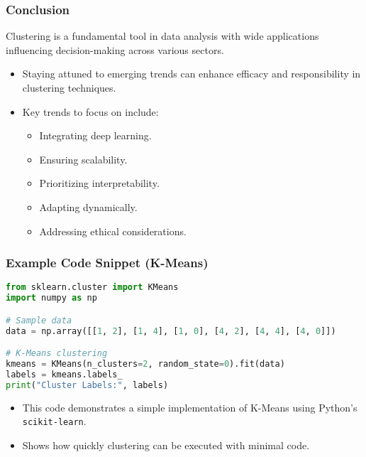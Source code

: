 \documentclass{beamer}
\begin{document}
\begin{frame}[fragile]
    \frametitle{Conclusion}
    Clustering is a fundamental tool in data analysis with wide applications influencing decision-making across various sectors. 

    \begin{itemize}
        \item Staying attuned to emerging trends can enhance efficacy and responsibility in clustering techniques.
        \item Key trends to focus on include:
        \begin{itemize}
            \item Integrating deep learning.
            \item Ensuring scalability.
            \item Prioritizing interpretability.
            \item Adapting dynamically.
            \item Addressing ethical considerations.
        \end{itemize}
    \end{itemize}
\end{frame}

\begin{frame}[fragile]
    \frametitle{Example Code Snippet (K-Means)}
    \begin{lstlisting}[language=Python]
from sklearn.cluster import KMeans
import numpy as np

# Sample data
data = np.array([[1, 2], [1, 4], [1, 0], [4, 2], [4, 4], [4, 0]])

# K-Means clustering
kmeans = KMeans(n_clusters=2, random_state=0).fit(data)
labels = kmeans.labels_
print("Cluster Labels:", labels)
    \end{lstlisting}
    \begin{itemize}
        \item This code demonstrates a simple implementation of K-Means using Python's \texttt{scikit-learn}.
        \item Shows how quickly clustering can be executed with minimal code.
    \end{itemize}
\end{frame}
\end{document}
